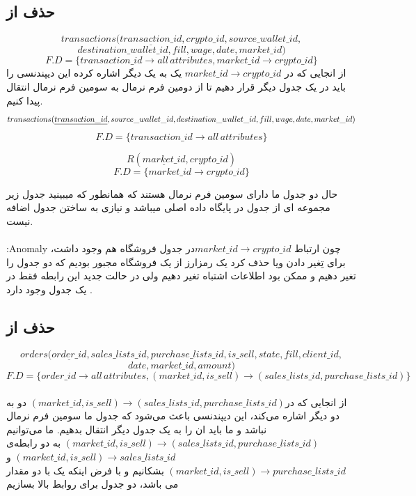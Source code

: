 \documentclass{book}
\begin{document}
\subsection{حذف  از }
$$transactions(\underline{transaction\_id}, crypto\_id, source\_wallet\_id,$$
$$destination\_wallet\_id, fill, wage, date,market\_id)$$
$$F.D = \{transaction\_id \rightarrow all\,attributes , market\_id \rightarrow crypto\_id\}$$
از انجایی که در $market\_id \rightarrow crypto\_id$ یک  به یک  دیگر اشاره کرده این دیپندنسی را باید در یک جدول دیگر قرار دهیم تا از دومین فرم نرمال به سومین فرم نرمال انتقال پیدا کنیم.
$$transactions(\underline{transaction\_id}, source\_wallet\_id,\newline
    destination\_wallet\_id, fill, wage, date,market\_id)$$
$$F.D = \{transaction\_id \rightarrow all\,attributes \}$$

$$R(\underline{market\_id}, crypto\_id)$$
$$F.D = \{market\_id \rightarrow crypto\_id\}$$

حال دو جدول ما دارای سومین فرم نرمال هستند که همانطور که میبینید جدول  زیر مجموعه ای از جدول  در پایگاه داده اصلی میباشد و نیازی به ساختن جدول اضافه نیست.
\\ \\
\large{:Anomaly} چون ارتباط $market\_id \rightarrow crypto\_id$در جدول فروشگاه هم وجود داشت، برای تِغیر دادن ویا حذف کرد یک رمزارز از یک فروشگاه مجبور بودیم که دو جدول را تغیر دهیم و ممکن بود اطلاعات اشتباه تغیر دهیم ولی در حالت جدید این رابطه فقط در یک جدول وجود دارد  .

\subsection{حذف  از }
$$orders(\underline{order\_id}, sales\_lists\_id,purchase\_lists\_id,is\_sell,state,fill,client\_id,$$
$$date,market\_id,amount)$$
$$F.D = \{order\_id \rightarrow all\,attributes, (market\_id , is\_sell) \rightarrow (sales\_lists\_id , purchase\_lists\_id)\}$$
\\
از انجایی که در$(market\_id , is\_sell) \rightarrow (sales\_lists\_id , purchase\_lists\_id)$ دو  به دو   دیگر اشاره می‌کند، این دیپندنسی باعث می‌شود که جدول ما سومین فرم نرمال نباشد و ما باید ان را به یک جدول دیگر انتقال بدهیم.
\newline ما می‌توانیم $(market\_id , is\_sell) \rightarrow (sales\_lists\_id , purchase\_lists\_id)$ به دو رابطه‌ی $(market\_id , is\_sell) \rightarrow sales\_lists\_id$ و $(market\_id , is\_sell) \rightarrow purchase\_lists\_id$ بشکانیم و با فرض اینکه  یک  با دو مقدار می باشد، دو جدول برای روابط بالا بسازیم
\end{document}
